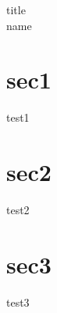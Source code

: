 \documentclass[10pt,a4j,report]{article}
\begin{document}
title\\
name


\section{sec1}
  test1
\section{sec2}
  test2
\section{sec3}
  test3

  
\end{document}
